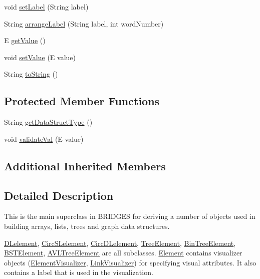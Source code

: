 \begin{DoxyCompactItemize}
\item 
void \hyperlink{classbridges_1_1base_1_1_element_a942ccd766aeca0c4fdbe27ef8cbe78d9}{set\+Label} (String label)
\item 
String \hyperlink{classbridges_1_1base_1_1_element_acd2191242df8a7bf2e8b6ced87880ba6}{arrange\+Label} (String label, int word\+Number)
\item 
E \hyperlink{classbridges_1_1base_1_1_element_a44ddc61db34b6cf0bab7dfba667d54af}{get\+Value} ()
\item 
void \hyperlink{classbridges_1_1base_1_1_element_ab3cf1241da0bc4c59cea9d6f0fd7aaf4}{set\+Value} (E value)
\item 
String \hyperlink{classbridges_1_1base_1_1_element_a7dc685e317fd9dc2e73e049a9f907e42}{to\+String} ()
\end{DoxyCompactItemize}
\subsection*{Protected Member Functions}
\begin{DoxyCompactItemize}
\item 
String \hyperlink{classbridges_1_1base_1_1_element_a6a1b70fa4b1936d10c6deb433acf8cd9}{get\+Data\+Struct\+Type} ()
\item 
void \hyperlink{classbridges_1_1base_1_1_element_af1a60f4e6a91d379179f7d56e6dc3829}{validate\+Val} (E value)
\end{DoxyCompactItemize}
\subsection*{Additional Inherited Members}


\subsection{Detailed Description}
This is the main superclass in B\+R\+I\+D\+G\+ES for deriving a number of objects used in building arrays, lists, trees and graph data structures. 

\hyperlink{classbridges_1_1base_1_1_d_lelement}{D\+Lelement}, \hyperlink{classbridges_1_1base_1_1_circ_s_lelement}{Circ\+S\+Lelement}, \hyperlink{classbridges_1_1base_1_1_circ_d_lelement}{Circ\+D\+Lelement}, \hyperlink{classbridges_1_1base_1_1_tree_element}{Tree\+Element}, \hyperlink{classbridges_1_1base_1_1_bin_tree_element}{Bin\+Tree\+Element}, \hyperlink{classbridges_1_1base_1_1_b_s_t_element}{B\+S\+T\+Element}, \hyperlink{classbridges_1_1base_1_1_a_v_l_tree_element}{A\+V\+L\+Tree\+Element} are all subclasses. \hyperlink{classbridges_1_1base_1_1_element}{Element} contains visualizer objects (\hyperlink{classbridges_1_1base_1_1_element_visualizer}{Element\+Visualizer}, \hyperlink{classbridges_1_1base_1_1_link_visualizer}{Link\+Visualizer}) for specifying visual attributes. It also contains a label that is used in the visualization.

